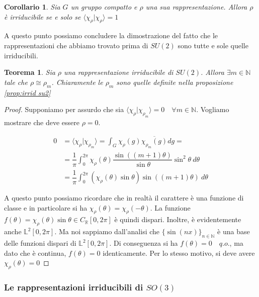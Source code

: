 \documentclass[11pt]{article}
\theoremstyle{plain}
\newtheorem{thm}{Teorema}[section]
\newtheorem*{cor}{Corollario}
\theoremstyle{definition}
\theoremstyle{remark}
\newcommand{\R}{\mathbb{R}}
\newcommand{\N}{\mathbb{N}}
\newcommand{\dint}{\displaystyle\int}
\begin{document}
 \begin{cor}
   Sia $G$ un gruppo compatto e $\rho$ una sua rappresentazione. Allora $\rho$ è irriducibile se e solo se $\langle \chi_\rho | \chi_\rho \rangle = 1$
 \end{cor}

 
 A questo punto possiamo concludere la dimostrazione del fatto che le rappresentazioni che abbiamo trovato prima di $SU(2)$ sono tutte e sole quelle irriducibili.

 
 \begin{thm}
   Sia $\rho$ una rappresentazione irriducibile di $SU(2)$. Allora $\exists m \in \N$ tale che $\rho \cong \rho_m$. Chiaramente le $\rho_m$ sono quelle definite nella proposizione \ref{prop:irrid su2}
 \end{thm}

 \begin{proof}
   Supponiamo per assurdo che sia $\langle \chi_\rho | \chi_{\rho_m} \rangle = 0 \quad \forall m \in \N$. Vogliamo mostrare che deve essere $\rho = 0$. 


   \begin{align*}
     0 &= \langle \chi_\rho | \chi_{\rho_m} \rangle = \dint_G \chi_\rho(g) \overline{\chi_{\rho_m} (g)} dg = \\
     &= \dfrac{1}{\pi} \dint_0^{2\pi} \chi_\rho(\theta) \dfrac{\sin((m+1)\theta)}{\sin\theta} \sin^2\theta  \ d\theta \\
     &= \dfrac{1}{\pi} \dint_{0}^{2\pi} \left(\chi_\rho (\theta) \sin\theta \right) \sin(  (m+1) \theta) \ d\theta
   \end{align*}

   A questo punto possiamo ricordare che in realtà il carattere è una funzione di classe e in particolare si ha $\chi_\rho(\theta) = \chi_\rho(-\theta)$. La funzione $f(\theta) = \chi_\rho(\theta) \sin\theta \in C_\R[0,2\pi]$ è quindi dispari. Inoltre, è evidentemente anche $\mathbb{L}^2 [0,2\pi]$. Ma noi sappiamo dall'analisi che $\{\sin(nx)\}_{n\in \N}$ è una base delle funzioni dispari di $\mathbb{L}^2[0,2\pi]$. Di conseguenza si ha $f(\theta) = 0 \quad q.o.$, ma dato che è continua, $f(\theta) = 0$ identicamente. Per lo stesso motivo, si deve avere $\chi_\rho(\theta) = 0$
   
 \end{proof}


 \newpage
 \subsubsection{Le rappresentazioni irriducibili di $SO(3)$}
\end{document}
